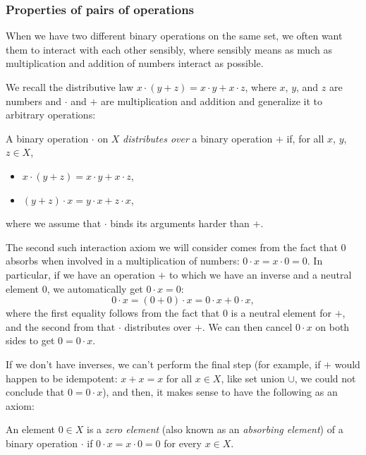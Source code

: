 \subsubsection{Properties of pairs of operations}
When we have two different binary operations on the same set, we often want them to interact with each other sensibly, where sensibly means as much as multiplication and addition of numbers interact as possible. 

We recall the distributive law $x\cdot(y + z) = x\cdot y + x\cdot z$, where $x$, $y$, and $z$ are numbers and $\cdot$ and $+$ are multiplication and addition and generalize it to arbitrary operations: 
\begin{Definition}
  A binary operation $\cdot$ on $X$ \emph{distributes over} a binary operation $+$ if, for all $x$, $y$, $z \in X$,
  \begin{itemize}
  \item $x \cdot (y + z) = x \cdot y + x \cdot z$,
  \item $(y + z) \cdot x = y \cdot x + z \cdot x$,
  \end{itemize}
  where we assume that $\cdot$ binds its arguments harder than $+$.
\end{Definition}

The second such interaction axiom we will consider comes from the fact that $0$ absorbs when involved in a multiplication of numbers: $0 \cdot x = x \cdot 0 = 0$. In particular, if we have an operation $+$ to which we have an inverse and a neutral element $0$, we automatically get $0 \cdot x = 0$:
\begin{equation*}
  0 \cdot x = (0 + 0) \cdot x = 0 \cdot x + 0 \cdot x,
\end{equation*}
where the first equality follows from the fact that $0$ is a neutral element for $+$, and the second from that $\cdot$ distributes over $+$. We can then cancel $0 \cdot x$ on both sides to get $0 = 0 \cdot x$.%

If we don't have inverses, we can't perform the final step (for example, if $+$ would happen to be idempotent: $x + x = x$ for all $x \in X$, like set union $\cup$, we could not conclude that $0 = 0 \cdot x$), and then, it makes sense to have the following as an axiom:
\begin{Definition}
  An element $0 \in X$ is a \emph{zero element} (also known as an \emph{absorbing element}) of a binary operation $\cdot$ if $0 \cdot x = x \cdot 0 = 0$ for every $x \in X$.
\end{Definition}

